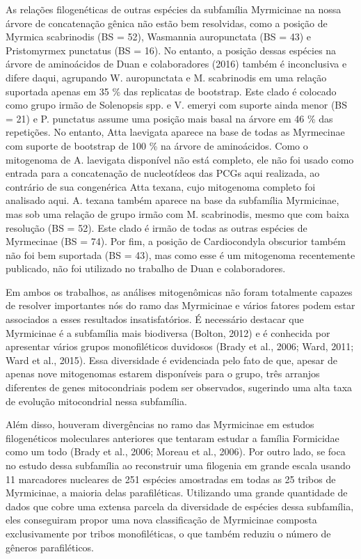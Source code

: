 \documentclass[../DISSERTACAO_MAIN.tex]{subfiles}
\begin{document}
	As relações filogenéticas de outras espécies da subfamília Myrmicinae na nossa árvore de concatenação gênica não estão bem resolvidas, como a posição de Myrmica scabrinodis (BS = 52), Wasmannia auropunctata (BS = 43) e Pristomyrmex punctatus (BS = 16). No entanto, a posição dessas espécies na árvore de aminoácidos de Duan e colaboradores (2016) também é inconclusiva e difere daqui, agrupando W. auropunctata e M. scabrinodis em uma relação suportada apenas em 35 \% das replicatas de bootstrap. Este clado é colocado como grupo irmão de Solenopsis spp. e V. emeryi com suporte ainda menor (BS = 21) e P. punctatus assume uma posição mais basal na árvore em 46 \% das repetições. No entanto, Atta laevigata aparece na base de todas as Myrmecinae com suporte de bootstrap de 100 \% na árvore de aminoácidos. Como o mitogenoma de A. laevigata disponível não está completo, ele não foi usado como entrada para a concatenação de nucleotídeos das PCGs aqui realizada, ao contrário de sua congenérica Atta texana, cujo mitogenoma completo foi analisado aqui. A. texana também aparece na base da subfamília Myrmicinae, mas sob uma relação de grupo irmão com M. scabrinodis, mesmo que com baixa resolução (BS = 52). Este clado é irmão de todas as outras espécies de Myrmecinae (BS = 74). Por fim, a posição de Cardiocondyla obscurior também não foi bem suportada (BS = 43), mas como esse é um mitogenoma recentemente publicado, não foi utilizado no trabalho de Duan e colaboradores.
	
	Em ambos os trabalhos, as análises mitogenômicas não foram totalmente capazes de resolver importantes nós do ramo das Myrmicinae e vários fatores podem estar associados a esses resultados insatisfatórios. É necessário destacar que Myrmicinae é a subfamília mais biodiversa (Bolton, 2012) e é conhecida por apresentar vários grupos monofiléticos duvidosos (Brady et al., 2006; Ward, 2011; Ward et al., 2015). Essa diversidade é evidenciada pelo fato de que, apesar de apenas nove mitogenomas estarem disponíveis para o grupo, três arranjos diferentes de genes mitocondriais podem ser observados, sugerindo uma alta taxa de evolução mitocondrial nessa subfamília.
	
	Além disso, houveram divergências no ramo das Myrmicinae em estudos filogenéticos moleculares anteriores que tentaram estudar a família Formicidae como um todo (Brady et al., 2006; Moreau et al., 2006). Por outro lado,  se foca no estudo dessa subfamília ao reconstruir uma filogenia em grande escala usando 11 marcadores nucleares de 251 espécies amostradas em todas as 25 tribos de Myrmicinae, a maioria delas parafiléticas. Utilizando uma grande quantidade de dados que cobre uma extensa parcela da diversidade de espécies dessa subfamília, eles conseguiram propor uma nova classificação de Myrmicinae composta exclusivamente por tribos monofiléticas, o que também reduziu o número de gêneros parafiléticos.
	
\end{document}
